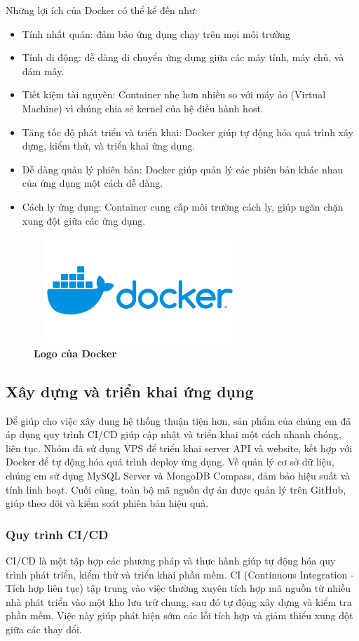 Những lợi ích của Docker có thể kể đến như:
\begin{itemize}
	\item Tính nhất quán: đảm bảo ứng dụng chạy trên mọi môi trường
	\item Tính di động: dễ dàng di chuyển ứng dụng giữa các máy tính, máy chủ, và đám mây.
	\item Tiết kiệm tài nguyên: Container nhẹ hơn nhiều so với máy ảo (Virtual Machine) vì chúng chia sẻ kernel của hệ điều hành host.
	\item Tăng tốc độ phát triển và triển khai: Docker giúp tự động hóa quá trình xây dựng, kiểm thử, và triển khai ứng dụng.
	\item Dễ dàng quản lý phiên bản: Docker giúp quản lý các phiên bản khác nhau của ứng dụng một cách dễ dàng.
	\item Cách ly ứng dụng: Container cung cấp môi trường cách ly, giúp ngăn chặn xung đột giữa các ứng dụng.
\end{itemize}

\begin{figure}[H]
	\centering
	\includegraphics[width=8cm,height=4cm]{Images/Technology/docker.jpg}
	\caption[Logo của Docker]{\bfseries \fontsize{12pt}{0pt}
		\selectfont Logo của Docker}
	\label{docker} %
\end{figure}


\subsection{Xây dựng và triển khai ứng dụng}
Để giúp cho việc xây dung hệ thống thuận tiện hơn, sản phẩm của chúng em đã áp dụng quy trình CI/CD giúp cập nhật và triển khai một cách nhanh chóng, liên tục. Nhóm đã sử dụng VPS để triển khai server API và website, kết hợp với Docker để tự động hóa quá trình deploy ứng dụng. Về quản lý cơ sở dữ liệu, chúng em sử dụng MySQL Server và MongoDB Compass, đảm bảo hiệu suất và tính linh hoạt. Cuối cùng, toàn bộ mã nguồn dự án được quản lý trên GitHub, giúp theo dõi và kiểm soát phiên bản hiệu quả.
\subsubsection{Quy trình CI/CD}
CI/CD là một tập hợp các phương pháp và thực hành giúp tự động hóa quy trình phát triển, kiểm thử và triển khai phần mềm. CI (Continuous Integration - Tích hợp liên tục) tập trung vào việc thường xuyên tích hợp mã nguồn từ nhiều nhà phát triển vào một kho lưu trữ chung, sau đó tự động xây dựng và kiểm tra phần mềm. Việc này giúp phát hiện sớm các lỗi tích hợp và giảm thiểu xung đột giữa các thay đổi.

